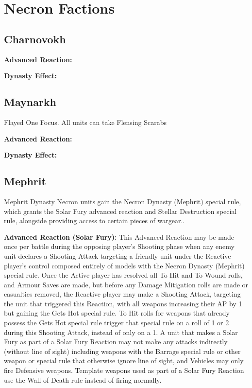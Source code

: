 \section{Necron Factions}

\subsection{Charnovokh}

\textbf{Advanced Reaction:}

\textbf{Dynasty Effect:}


\subsection{Maynarkh}

Flayed One Focus. All units can take Flensing Scarabs

\textbf{Advanced Reaction:}

\textbf{Dynasty Effect:}


\subsection{Mephrit}

Mephrit Dynasty Necron units gain the Necron Dynasty (Mephrit) special rule, which grants the Solar Fury advanced reaction and Stellar Destruction special rule, alongside providing access to certain pieces of wargear..

\textbf{Advanced Reaction (Solar Fury):} This Advanced Reaction may be made once per battle during the opposing player’s Shooting phase when any enemy unit declares a Shooting Attack targeting a friendly unit under the Reactive player’s control composed entirely of models with the Necron Dynasty (Mephrit) special rule. Once the Active player has resolved all To Hit and To Wound rolls, and Armour Saves are made, but before any Damage Mitigation rolls are made or casualties removed, the Reactive player may make a Shooting Attack, targeting the unit that triggered this Reaction, with all weapons increasing their AP by 1 but gaining the Gets Hot special rule. To Hit rolls for weapons that already possess the Gets Hot special rule trigger that special rule on a roll of 1 or 2 during this Shooting Attack, instead of only on a 1. A unit that makes a Solar Fury as part of a Solar Fury Reaction may not make any attacks indirectly (without line of sight) including weapons with the Barrage special rule or other weapon or special rule that otherwise ignore line of sight, and Vehicles may only fire Defensive weapons. Template weapons used as part of a Solar Fury Reaction use the Wall of Death rule instead of firing normally.

